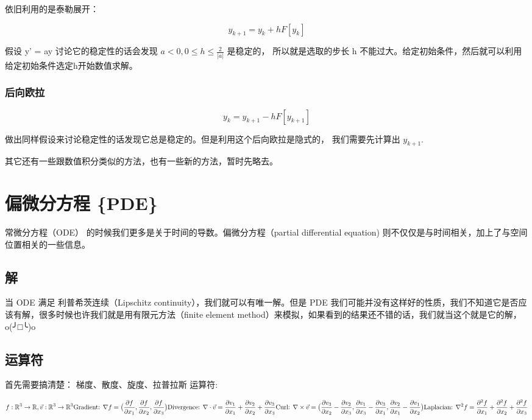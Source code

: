 \documentclass[
]{book}
\begin{document}
依旧利用的是泰勒展开：

\[y_{k+1} = y_k+hF[y_k]\]

假设 y' = ay 讨论它的稳定性的话会发现 \(a < 0 ,0 \le h \le \frac{2}{|a|}\) 是稳定的， 所以就是选取的步长 h 不能过大。给定初始条件，然后就可以利用给定初始条件选定h开始数值求解。

\hypertarget{ux540eux5411ux6b27ux62c9}{%
\subsection{后向欧拉}\label{ux540eux5411ux6b27ux62c9}}

\[y_k = y_{k+1} - hF[y_{k+1}]\]

做出同样假设来讨论稳定性的话发现它总是稳定的。但是利用这个后向欧拉是隐式的， 我们需要先计算出 \(y_{k+1}\).

其它还有一些跟数值积分类似的方法，也有一些新的方法，暂时先略去。

\hypertarget{ux504fux5faeux5206ux65b9ux7a0b-pde}{%
\chapter{偏微分方程 \{PDE\}}\label{ux504fux5faeux5206ux65b9ux7a0b-pde}}

常微分方程（ODE） 的时候我们更多是关于时间的导数。偏微分方程（partial differential equation) 则不仅仅是与时间相关，加上了与空间位置相关的一些信息。

\hypertarget{ux89e3}{%
\section{解}\label{ux89e3}}

当 ODE 满足 利普希茨连续（Lipschitz continuity），我们就可以有唯一解。但是 PDE 我们可能并没有这样好的性质，我们不知道它是否应该有解，很多时候也许我们就是用有限元方法（finite element method）来模拟，如果看到的结果还不错的话，我们就当这个就是它的解，o(╯□╰)o

\hypertarget{ux8fd0ux7b97ux7b26}{%
\section{运算符}\label{ux8fd0ux7b97ux7b26}}

首先需要搞清楚： 梯度、散度、旋度、拉普拉斯 运算符:

\[ f: \mathbb{R}^3 \to \mathbb{R}, \vec{v}: \mathbb{R}^3 \to \mathbb{R}^3  \\
\text{Gradient: } \nabla f = \big( \frac{\partial f}{\partial x_1}, \frac{\partial f}{\partial x_2},\frac{\partial f}{\partial x_3}\big) \\
\text{Divergence: } \nabla \cdot \vec{v} = \frac{\partial v_1}{\partial x_1} + \frac{\partial v_2}{\partial x_2} + \frac{\partial v_3}{\partial x_3} \\
\text{Curl: } \nabla \times \vec{v} = \big( \frac{\partial v_3}{\partial x_2} - \frac{\partial v_2}{\partial x_3} ,  \frac{\partial v_1}{\partial x_3} - \frac{\partial v_3}{\partial x_1}, \frac{\partial v_2}{\partial x_1} - \frac{\partial v_1}{\partial x_2} \big) \\
\text{Laplacian: } \nabla^2 f = \frac{\partial^2 f}{\partial x_1} + \frac{\partial^2 f}{\partial x_2} + \frac{\partial^2 f}{\partial x_3}
\]
\end{document}
